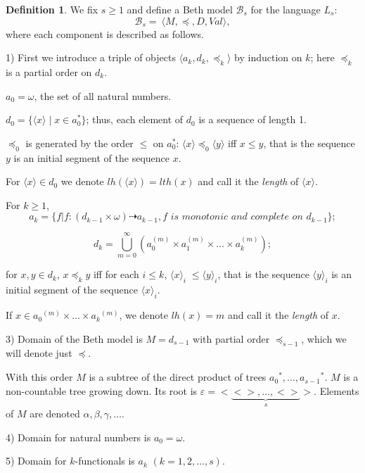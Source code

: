 \documentclass{asl}
\theoremstyle{definition}
\newtheorem{definition}{Definition}[section]
\begin{document}
\begin{definition} We fix $ s\geqslant1 $ and define a Beth model $\mathcal{B}_s$ for the language $L_s$:
\[ \mathcal{B}_s=~\langle M, \preccurlyeq, D, Val \rangle, \] 
where each component is described as follows.

1) First we introduce a triple of objects $\langle a_k,d_k, \preccurlyeq_k \rangle$ by induction on $k$; here $\preccurlyeq_k$ is a partial order on $d_k$.

$a_0=\omega$, the set of all natural numbers.

$d_0=\lbrace \langle x\rangle \mid x\in a_0^*\rbrace$; thus, each element of $d_0$ is a sequence of length 1.

$\preccurlyeq_0$ is generated by the order $ \leqslant $ on $a_0^*$: $\langle x\rangle\preccurlyeq_0 \langle y\rangle$ iff $x\leqslant y$, that is the sequence $y$ is an initial segment of the sequence $x$.

For $\langle x\rangle\in d_0$ we denote $lh(\langle x\rangle)=lth(x)$ and call it the \textit{length} of $\langle x\rangle$.

For $k\geqslant 1$,
\[ a_{k}= \{ f|f:(d_{k-1} \times\omega) \dashrightarrow a_{k-1}, \textit{f is monotonic and complete on } d_{k-1}\}; \]

\[ d_k=\displaystyle\bigcup_{m=0}^\infty \left( {a_0^{(m)}} \times{a_1^{(m)}}\times\ldots \times {a_{k}^{(m)}}\right); \]
\medskip

for $x,y\in d_k$, $x\preccurlyeq_k y$ iff for each $i\leqslant k$, $\langle x\rangle_i\; \leqslant \langle y\rangle_i$, that is the sequence $\langle y\rangle_i$ is an initial segment of the sequence $\langle x\rangle_i$.
\medskip

If $x \in {a_0}^{(m)} \times\ldots \times {a_{k}}^{(m)} $, we denote $ lh(x)=m$ and call it the \textit{length} of $x$. 
\medskip

3) Domain of the Beth model is $M=d_{s-1}$ with partial order $\preccurlyeq_{s-1}$, which we will denote just $\preccurlyeq$. 

With this order $M$ is a subtree of the direct product of trees ${a_0}^* ,\ldots, {a_{s-1}}^* $. $M$ is a non-countable tree growing down. Its root is 
$ \varepsilon = <\underbrace{< >,\ldots,< >}_s>$. 
Elements of $M$ are denoted $\alpha,\beta, \gamma,\ldots $. 

4) Domain for natural numbers is $a_0 =\omega$.

5) Domain for $k$-functionals is $ a_{k}$ $(k=1,2,\ldots,s)$.


\end{definition}
\end{document}

